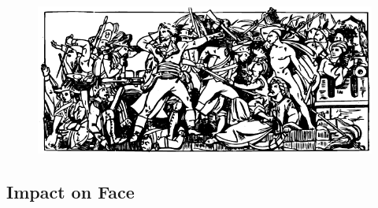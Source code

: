 \documentclass[12pt]{book}  %
\begin{document}
\begin{figure}[h]
    \centering
    \includegraphics[width=\textwidth]{./images/combat17.pdf}
\end{figure}

\subsection{Impact on Face}
\end{document}
